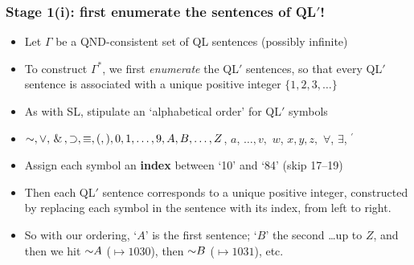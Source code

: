 \begin{frame}
\frametitle{Stage 1(i): first enumerate the sentences of QL$'$!}

\begin{itemize}[<+->]

\item Let $\Gamma$ be a QND-consistent set of QL sentences (possibly infinite)

\item To construct $\Gamma^{\ast}$, we first \emph{enumerate} the QL$'$ sentences, so that every QL$'$ sentence is associated with a unique positive integer $\{1, 2, 3, \dots \}$


\item As with SL, stipulate an `alphabetical order' for QL$'$ symbols

\item $\enot, \eor, \eand, \eif, \eiff, (, ), 0, 1, \dots, 9, A, B, \dots, Z$, \emph{$a$}, $\dots, v,$ \emph{$w$}, $x, y, z,$ \emph{$\forall$}, \emph{$\exists$}, \emph{$^{\prime}$}

\item Assign each symbol an \textbf{index} between `10' and `84' (skip 17--19) %

\item Then each QL$'$ sentence corresponds to a unique positive integer, constructed by replacing each symbol in the sentence with its index, from left to right. 

\item So with our ordering, `$A$' is the first sentence; `$B$' the second \dots up to $Z$, and then we hit $\enot A$ ($\mapsto 1030$), then $\enot B$ ($\mapsto 1031$), etc. 


\end{itemize}
\end{frame}

